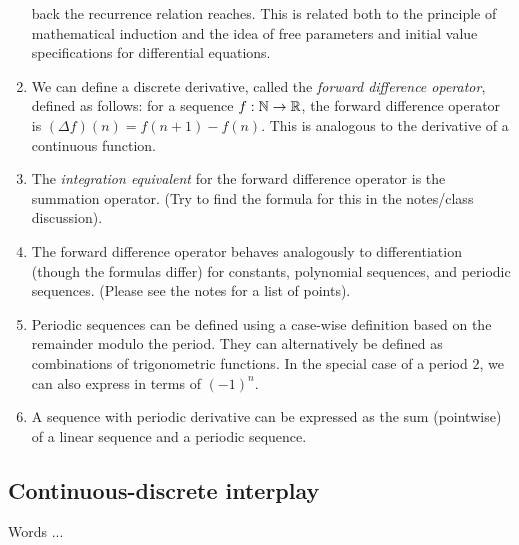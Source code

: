 \documentclass[10pt]{amsart}
\begin{document}
\begin{enumerate}
  back the recurrence relation reaches. This is related both to the
  principle of mathematical induction and the idea of free parameters
  and initial value specifications for differential equations.
\item We can define a discrete derivative, called the {\em forward
  difference operator}, defined as follows: for a sequence $f:\mathbb{N} \to
  \mathbb{R}$, the forward difference operator is $(\Delta f)(n) = f(n + 1) -
  f(n)$. This is analogous to the derivative of a continuous function.
\item The {\em integration equivalent} for the forward difference
  operator is the summation operator. (Try to find the formula for
  this in the notes/class discussion).
\item The forward difference operator behaves analogously to
  differentiation (though the formulas differ) for constants,
  polynomial sequences, and periodic sequences. (Please see the notes
  for a list of points).
\item Periodic sequences can be defined using a case-wise definition
  based on the remainder modulo the period. They can alternatively be
  defined as combinations of trigonometric functions. In the special
  case of a period $2$, we can also express in terms of $(-1)^n$.
\item A sequence with periodic derivative can be expressed as the sum
  (pointwise) of a linear sequence and a periodic sequence.
\end{enumerate}

\subsection{Continuous-discrete interplay}

Words ...
\end{document}

